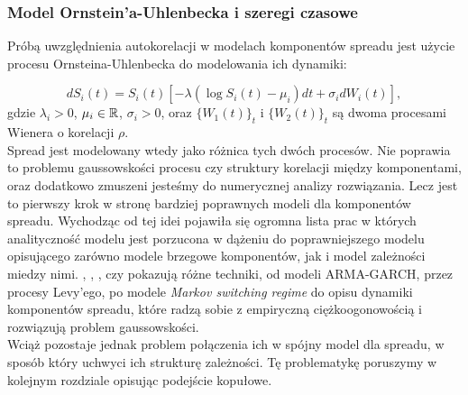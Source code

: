 \subsubsection{Model Ornstein'a-Uhlenbecka i szeregi czasowe}

Próbą uwzględnienia autokorelacji w modelach komponentów spreadu jest użycie procesu Ornsteina-Uhlenbecka do modelowania ich dynamiki:

$$ dS_i(t) =S_i(t)[-\lambda (\log S_i(t) - \mu_i)dt + \sigma_i dW_i(t)],$$
gdzie $\lambda_i>0$,  $\mu_i \in \mathbb{R}$, $\sigma_i >0$, oraz $\{W_1(t)\}_t$ i $\{W_2(t)\}_t$ są dwoma procesami Wienera o korelacji $\rho$.\\

Spread jest modelowany wtedy jako różnica tych dwóch procesów. Nie poprawia to problemu gaussowskości procesu czy struktury korelacji między komponentami, oraz dodatkowo zmuszeni jesteśmy do numerycznej analizy rozwiązania. Lecz jest to pierwszy krok w stronę bardziej poprawnych modeli dla komponentów spreadu. Wychodząc od tej idei pojawiła się ogromna lista prac w których analityczność modelu jest porzucona w dążeniu do poprawniejszego modelu opisującego zarówno modele brzegowe komponentów, jak i model zależności miedzy nimi. \cite{Herath_Copula_Crack_Spread}, \cite{Eyigungor_Markov_Spreads}, \cite{Espen_Crack_Spread_Copula}, czy \cite{Bernard_Pricing_Multivariate_Options_with_copulae} pokazują różne techniki, od modeli ARMA-GARCH, przez procesy Levy'ego, po modele \emph{Markov switching regime} do opisu dynamiki komponentów spreadu, które radzą sobie z empiryczną ciężkoogonowością i rozwiązują problem gaussowskości.\\

Wciąż pozostaje jednak problem połączenia ich w spójny model dla spreadu, w sposób który uchwyci ich strukturę zależności. Tę problematykę poruszymy w kolejnym rozdziale opisując podejście kopułowe.